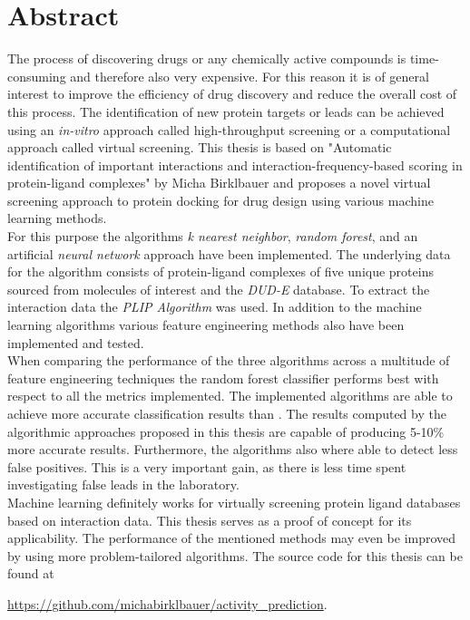 \chapter{Abstract}

The process of discovering drugs or any chemically active compounds is time-consuming and therefore also very expensive.
For this reason it is of general interest to improve the efficiency of drug discovery and reduce the overall cost of this process.
The identification of new protein targets or leads can be achieved using an \textit{in-vitro} approach called high-throughput screening or a computational 
approach called virtual screening. 
This thesis is based on "Automatic identification of important interactions and interaction-frequency-based scoring in protein-ligand complexes" by Micha Birklbauer\cite[]{Birklbauer2021} and
proposes a novel virtual screening approach to protein docking for drug design using various machine learning methods.
\\
For this purpose the algorithms \textit{k nearest neighbor}, \textit{random forest}, and an artificial \textit{neural network} approach have been implemented.
The underlying data for the algorithm consists of protein-ligand complexes of five unique proteins sourced from molecules of interest and the \textit{DUD-E} database\cite[]{Mysinger2012}.
To extract the interaction data the \textit{PLIP Algorithm}\cite[]{Salentin2015} was used.
In addition to the machine learning algorithms various feature engineering methods also have been implemented and tested.
\\
When comparing the performance of the three algorithms across a multitude of feature engineering techniques the random forest classifier performs 
best with respect to all the metrics implemented.
The implemented algorithms are able to achieve more accurate classification results than \cite[]{Birklbauer2021}. The results computed by the algorithmic approaches proposed in this thesis
are capable of producing 5-10\% more accurate results. Furthermore, the algorithms also where able to detect less false positives. This is a very important gain, as there is less time spent 
investigating false leads in the laboratory.
\\
Machine learning definitely works for virtually screening protein ligand databases based on interaction data. This thesis serves as a proof of concept for its applicability.
The performance of the mentioned methods may even be improved by using more problem-tailored algorithms. 
The source code for this thesis can be found at

\href{https://github.com/michabirklbauer/activity_prediction}{https://github.com/michabirklbauer/activity\_prediction}. 
